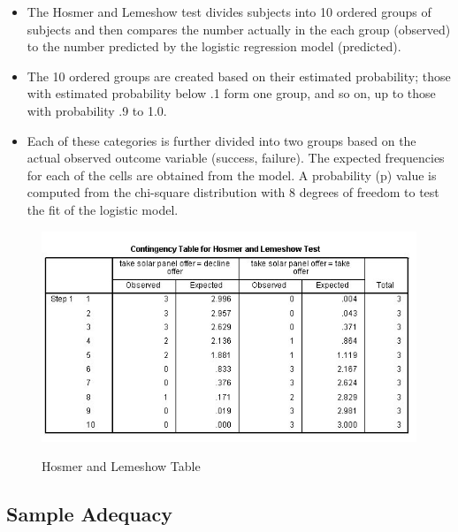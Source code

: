\documentclass[a4paper,12pt]{article}
\begin{document}
\begin{itemize}
	\item The Hosmer and Lemeshow test
	divides subjects into 10 ordered groups of subjects and then compares the number
	actually in the each group (observed) to the number predicted by the logistic regression
	model (predicted). 
	\item The 10 ordered groups are created based on their estimated probability; those with estimated probability below .1 form one group, and so on, up to those with probability .9 to 1.0.
	\item 
	Each of these categories is further divided into two groups based on the actual observed outcome variable (success, failure). The expected frequencies for each of the cells are obtained from the model. A probability (p) value is
	computed from the chi-square distribution with 8 degrees of freedom to test the fit of the logistic model.
	
\end{itemize}
\begin{figure}[h!]
	\begin{center}
		\includegraphics[scale=0.6]{images/Logistic6}\\
		\caption{Hosmer and Lemeshow Table}
	\end{center}
\end{figure}

\subsection{Sample Adequacy}
\end{document}

